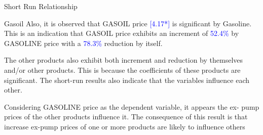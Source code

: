 \documentclass{beamer}
\newcommand{\textHighlight}[1]{\textcolor{blue}{#1}}
\begin{document}
	\begin{frame}{Short Run Relationship}
		
		\begin{block}{Gasoil}
			Also, it is observed that GASOIL price \textHighlight{[4.17*]} is significant by Gasoline. This is an indication that GASOIL price exhibits an increment of \textHighlight{52.4\%} by GASOLINE price with a \textHighlight{78.3\%} reduction by itself. 
		\end{block}
	
		\begin{block}{}
			The other products also exhibit both increment and reduction by themselves and/or other products. This is because the coefficients of these products are significant. The short-run results also indicate that the variables influence each other.
		\end{block}
		\begin{block}{}
			 Considering GASOLINE price as the dependent variable, it appears the ex- pump prices of the other products influence it. The consequence of this result is that increase ex-pump prices of one or more products are likely to influence others
		\end{block}
		
	\end{frame}
	
	
	
	
	
	
	
	
	
	
	
\end{document}
